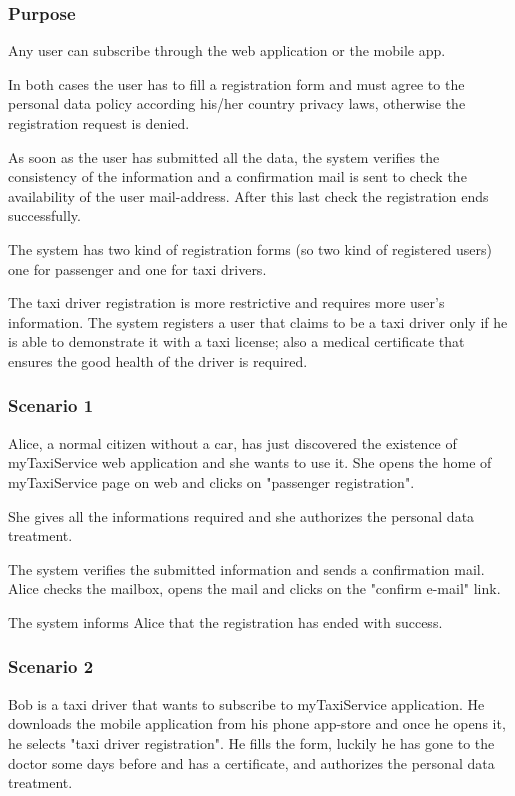 \label{user-registration}
\subsubsection{Purpose}
Any user can subscribe through the web application or the mobile app. 

In both cases the user has to fill a registration form and must agree to the personal data policy according his/her country privacy laws, otherwise the registration request is denied.

As soon as the user has submitted all the data, the system verifies the consistency of the information and a confirmation mail is sent to check the availability of the user mail-address.  After this last check the registration ends successfully.

The system has two kind of registration forms (so two kind of registered users) one for passenger and one for taxi drivers.

The taxi driver registration is more restrictive and requires more user's information.
The system registers a user that claims to be a taxi driver only if he is able to demonstrate it with a taxi license; also a medical certificate that ensures the good health of the driver is required.

\subsubsection{Scenario 1}
Alice, a normal citizen without a car, has just discovered the existence of myTaxiService web application and she wants to use it. 
She opens the home of myTaxiService page on web and clicks on "passenger registration". 

She gives all the informations required and she authorizes the personal data treatment. 

The system verifies the submitted information and sends a confirmation mail.
Alice checks the mailbox, opens the mail and clicks on the "confirm e-mail" link. 

The system informs Alice that the registration has ended with success.

\subsubsection{Scenario 2}
Bob is a taxi driver that wants to subscribe to myTaxiService application. 
He downloads the mobile application from his phone app-store and once he opens it, he selects "taxi driver registration". 
He fills the form, luckily he has gone to the doctor some days before and has a certificate, and authorizes the personal data treatment.

